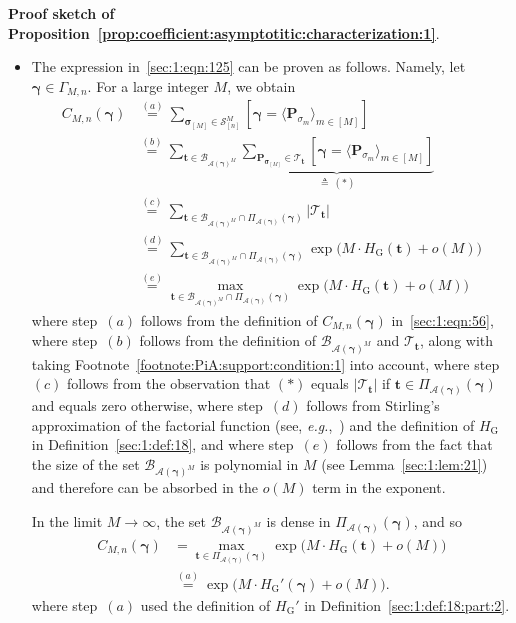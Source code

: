 \documentclass[journal,lettersize,twocolumn]{IEEEtran} %
\newcommand{\vect}[1]{ \bm{#1} }
\newcommand{\set}[1]{\mathcal{#1}}
\newcommand{\vgam}{ \vect{\gamma} }
\newcommand{\matr}[1]{ \bm{#1} }
\newcommand{\defeq}{ \triangleq }
\newcommand{\vsigma}{ \bm{\sigma} }
\newcommand{\setS}{\set{S}}
\newcommand{\CM}[1]{\Cgen{M}{#1}}
\newcommand{\Cgen}[2]{C_{#1,#2}}
\newcommand{\mP}{\matr{P}}
\newcommand{\setA}{ \set{A} }
\newcommand{\HG}{H_{ \mathrm{G} }}
\newcommand{\PiA}[1]{ \Pi_{\setA(#1)} }
\newcommand{\GamMn}{ \Gamma_{M,n} }
\newcommand{\eg}{\textit{e.g.}}
\begin{document}
\noindent
\textbf{Proof sketch of
  Proposition~\ref{prop:coefficient:asymptotitic:characterization:1}}.
\begin{itemize}

\item The expression in~\eqref{sec:1:eqn:125} can be proven as
  follows. Namely, let $\vgam \in \GamMn$. For a large integer $M$, we obtain
  \begin{align*}
    \CM{n}( \vgam )
      &\overset{(a)}{=}
         \sum_{ \vsigma_{[M]} \in \setS_{[n]}^{M} }
           \left[ 
             \vgam = \bigl\langle \mP_{\sigma_{m}} \bigr\rangle_{m \in [M]}
           \right] \\
      &\overset{(b)}{=}
         \sum_{ \bm{t} \in \set{B}_{\setA(\vgam)^{M}} }
           \underbrace
           {
             \sum_{ \mP_{\vsigma_{[M]}} \in \set{T}_{\bm{t}}}
               \left[ 
                 \vgam = \bigl\langle \mP_{\sigma_{m}} \bigr\rangle_{m \in [M]}
               \right]
           }_{\defeq \ (*)} \\
      &\overset{(c)}{=}
         \sum_{ \bm{t} \in \set{B}_{\setA(\vgam)^{M}} \cap \PiA{\vgam}( \vgam )}
           |\set{T}_{\bm{t}}| \\
      &\overset{(d)}{=}
         \sum_{ \bm{t} \in \set{B}_{\setA(\vgam)^{M}} \cap \PiA{\vgam}( \vgam )}
           \exp\bigl( M \cdot \HG( \bm{t} ) + o( M ) \bigr) \\
      &\overset{(e)}{=}
         \max_{ \bm{t} \in \set{B}_{\setA(\vgam)^{M}} \cap \PiA{\vgam}( \vgam )}
           \exp\bigl( M \cdot \HG( \bm{t} ) + o( M ) \bigr)
  \end{align*}
  where step~$(a)$ follows from the definition of $\CM{n}( \vgam )$
  in~\eqref{sec:1:eqn:56}, where step~$(b)$ follows from the definition of
  $\set{B}_{\setA(\vgam)^{M}}$ and $\set{T}_{\bm{t}}$, along with taking
  Footnote~\ref{footnote:PiA:support:condition:1} into account, where
  step~$(c)$ follows from the observation that $(*)$ equals
  $|\set{T}_{\bm{t}}|$ if $\bm{t} \in \PiA{\vgam}(\vgam)$ and equals zero
  otherwise, where step~$(d)$ follows from Stirling's approximation of the
  factorial function (see, \eg,~\cite{Robbins1955}) and the definition of
  $\HG$ in Definition~\ref{sec:1:def:18}, and where step~$(e)$ follows from
  the fact that the size of the set $\set{B}_{\setA(\vgam)^{M}}$ is polynomial
  in $M$ (see Lemma~\ref{sec:1:lem:21}) and therefore can be absorbed in the
  $o(M)$ term in the exponent.
  
  In the limit $M \to \infty$, the set $\set{B}_{\setA(\vgam)^{M}}$ is dense
  in $\PiA{\vgam}( \vgam )$, and so
  \begin{align*}
    \CM{n}( \vgam )
      &= \max_{ \bm{t} \in \PiA{\vgam}( \vgam )}
           \exp\bigl( M \cdot \HG( \bm{t} ) + o( M ) \bigr) \\
      &\overset{(a)}{=}
         \exp\bigl( M \cdot \HG'( \vgam ) + o( M ) \bigr).
  \end{align*}
  where step~$(a)$ used the definition of $\HG'$ in
  Definition~\ref{sec:1:def:18:part:2}.


\end{itemize}
\end{document}
